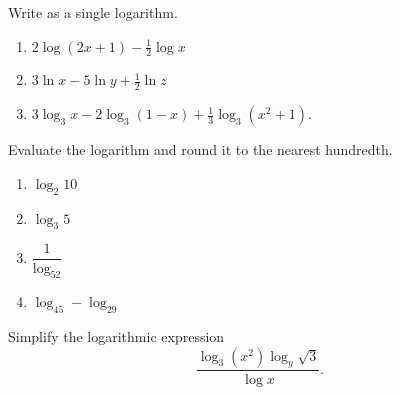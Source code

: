 \begin{exercise}

Write as a single logarithm.

\begin{enumerate}
\item
  \(2\log(2x+1)-\frac12\log x\)
\item
  \(3\ln x - 5\ln y + \frac{1}{2}\ln z\)
\item
  \(3\log_3 x-2\log_3(1-x)+\frac13\log_3 (x^2+1)\).
\end{enumerate}

\end{exercise}

\begin{exercise}

Evaluate the logarithm and round it to the nearest hundredth.

\begin{enumerate}
\item
  \(\log_2 10\)
\item
  \(\log_3 5\)
\item
  \(\dfrac{1}{\log_52}\)
\item
  \(\log_45-\log_29\)
\end{enumerate}

\end{exercise}

\begin{exercise}

Simplify the logarithmic expression \[
\frac{\log_3(x^2)\log_y\sqrt{3}}{\log x}.
\]

\end{exercise}

